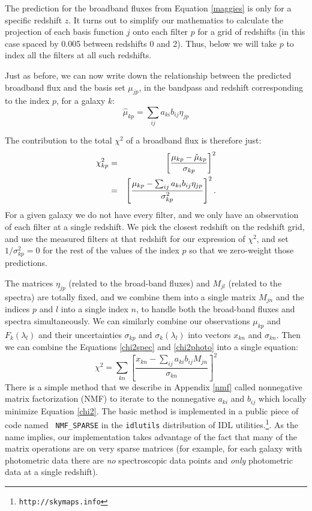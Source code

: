 \documentclass[12pt,preprint]{aastex}
\begin{document}
The prediction for the broadband fluxes from Equation
\ref{maggies} is only for a specific redshift $z$. It turns out to
simplify our mathematics to calculate the projection of each basis
function $j$ onto each filter $p$ for a grid of redshifts (in this
case spaced by 0.005 between redshifts 0 and 2). Thus, below we will
take $p$ to index all the filters at all such redshifts.

Just as before, we can now write down the relationship between the
predicted broadband flux and the basis set $\mu_{jp}$, in the bandpass
and redshift corresponding to the index $p$, for a galaxy $k$:
\begin{equation}
\hat{\mu}_{kp} = \sum_{ij} a_{ki} b_{ij} \eta_{jp}
\end{equation}

The contribution to the total $\chi^2$ of a broadband flux is
therefore just:
\begin{eqnarray}
\label{chi2photo}
\chi^2_{kp} &=& \left[\frac{\mu_{kp} - \hat\mu_{kp}}
{\sigma_{kp}}\right]^2 \cr
&=&
\left[\frac{\mu_{kp} -
\sum_{ij} a_{ki} b_{ij} \eta_{jp}
}{\sigma^2_{kp}}\right]^2. 
\end{eqnarray}
For a given galaxy we do not have every filter, and we only have an
observation of each filter at a single redshift. We pick the closest
redshift on the redshift grid, and use the measured filters at that
redshift for our expression of $\chi^2$, and set $1/\sigma_{kp}^2 = 0$
for the rest of the values of the index $p$ so that we zero-weight
those predictions.

The matrices $\eta_{jp}$ (related to the broad-band fluxes) and
$M_{jl}$ (related to the spectra) are totally fixed, and we combine
them into a single matrix $M_{jn}$ and the indices $p$ and $l$ into a
single index $n$, to handle both the broad-band fluxes and spectra
simultaneously. We can similarly combine our observations $\mu_{kp}$
and $F_{k}(\lambda_l)$ and their uncertainties $\sigma_{kp}$
and $\sigma_{k}(\lambda_l)$ into vectors $x_{kn}$ and $\sigma_{kn}$.
Then we can combine the Equations \ref{chi2spec} and
\ref{chi2photo} into a single equation:
\begin{equation}
\label{chi2}
\chi^2 = \sum_{kn} \left[ 
\frac{x_{kn} - \sum_{ij} a_{ki} b_{ij} M_{jn}}
{\sigma_{kn}} \right]^2
\end{equation}
There is a simple method that we describe in Appendix \ref{nmf} called
nonnegative matrix factorization (NMF) to iterate to the nonnegative
$a_{ki}$ and $b_{ij}$ which locally minimize Equation \ref{chi2}. The
basic method is implemented in a public piece of code named {\tt
NMF\_SPARSE} in the {\tt idlutils} distribution of IDL
utilities.\footnote{\tt http://skymaps.info}. As the name implies, our
implementation takes advantage of the fact that many of the matrix
operations are on very sparse matrices (for example, for each galaxy
with photometric data there are {\it no} spectroscopic data points and
{\it only} photometric data at a single redshift).
\end{document}
